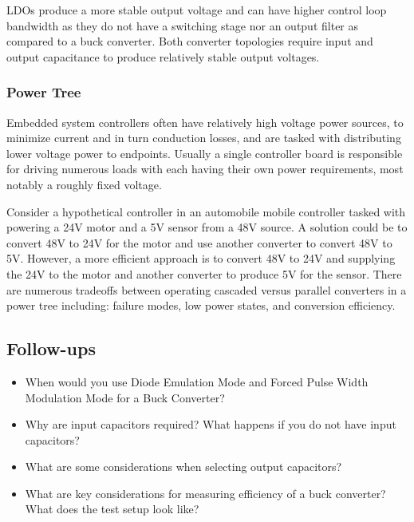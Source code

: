 \documentclass[main.tex]{subfiles}
\begin{document}
\newnoindentpara LDOs produce a more stable output voltage and can have higher control loop bandwidth as they do not have a switching stage nor an output filter as compared to a buck converter. Both converter topologies require input and output capacitance to produce relatively stable output voltages.

\subsubsection{Power Tree}
Embedded system controllers often have relatively high voltage power sources, to minimize current and in turn conduction losses, and are tasked with distributing lower voltage power to endpoints. Usually a single controller board is responsible for driving numerous loads with each having their own power requirements, most notably a roughly fixed voltage. \newline

\newnoindentpara Consider a hypothetical controller in an automobile mobile controller tasked with powering a 24V motor and a 5V sensor from a 48V source. A solution could be to convert 48V to 24V for the motor and use another converter to convert 48V to 5V. However, a more efficient approach is to convert 48V to 24V and supplying the 24V to the motor and another converter to produce 5V for the sensor. There are numerous tradeoffs between operating cascaded versus parallel converters in a power tree including: failure modes, low power states, and conversion efficiency. 

\subsection{Follow-ups}
\begin{itemize}
    \item When would you use Diode Emulation Mode and Forced Pulse Width Modulation Mode for a Buck Converter?  %
    \item Why are input capacitors required? What happens if you do not have input capacitors? %
    \item What are some considerations when selecting output capacitors? %
    \item What are key considerations for measuring efficiency of a buck converter? What does the test setup look like? %
\end{itemize}
\end{document}
